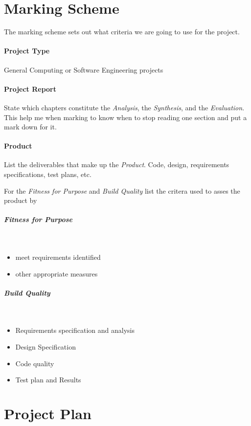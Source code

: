 \section{Marking Scheme}
The marking scheme sets out what criteria we are going to use for the project.

\paragraph{Project Type} General Computing or Software Engineering projects

\paragraph{Project Report}  State which chapters constitute the \emph{Analysis}, the \emph{Synthesis}, and the \emph{Evaluation}.  This help me when marking to know when to stop reading one section and put a mark down for it.

\paragraph{Product}  List the deliverables that make up the \emph{Product}.  Code, design, requirements specifications, test plans, etc.

For the \emph{Fitness for Purpose} and \emph{Build Quality}  list the critera used to asses the product by

\subparagraph{Fitness for Purpose}~
\begin{itemize}
	\item meet requirements identified
	\item other appropriate measures
\end{itemize}

\subparagraph{Build Quality}~
\begin{itemize}
	\item Requirements specification and analysis
	\item Design Specification
	\item Code quality
	\item Test plan and Results
\end{itemize}

\clearpage

\section{Project Plan}
\noindent
{}
